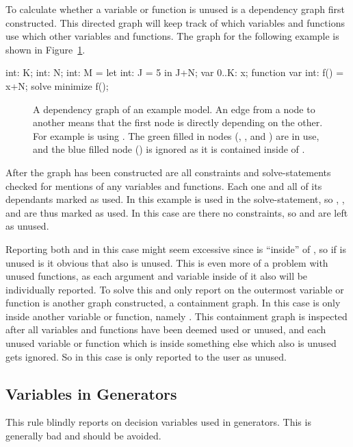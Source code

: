\documentclass[a4paper,12pt]{article}
\begin{document}
To calculate whether a variable or function is unused is a dependency graph first
constructed. This directed graph will keep track of which variables and functions use
which other variables and functions. The graph for the following example is shown in
Figure~\ref{fig:unused:graph}.

\begin{mznnobreak}
int: K; int: N;
int: M = let {int: J = 5} in J+N;
var 0..K: x;
function var int: f() = x+N;
solve minimize f();
\end{mznnobreak}

\begin{figure}[ht]
  \centering
  \smallskip%
  
  \smallskip%
  \caption{A dependency graph of an example model. An edge from a node to another means that
    the first node is directly depending on the other. For example is  using .
    The green filled in nodes (, ,  and ) are in use, and the blue
    filled node () is ignored as it is contained inside of .}%
  \label{fig:unused:graph}
\end{figure}

After the graph has been constructed are all constraints and solve-statements checked for
mentions of any variables and functions. Each one and all of its
dependants marked as used. In this example is  used in the solve-statement, so
, ,  and  are thus marked as used. In this case are there no
constraints, so  and  are left as unused.

Reporting both  and  in this case might seem excessive since  is
``inside'' of , so if  is unused is it obvious that  also is unused.
This is even more of a problem with unused functions, as each argument and variable inside
of it also will be individually reported. To solve this and only report on the outermost
variable or function is another graph constructed, a containment graph. In this case is
only  inside another variable or function, namely . This containment graph is
inspected after all variables and functions have been deemed used or unused, and each
unused variable or function which is inside something else which also is unused gets
ignored. So in this case is only  reported to the user as unused.

\subsection{Variables in Generators}\label{sec:rule:vargen}
This rule blindly reports on decision variables used in generators. This is generally
bad and should be avoided.
\end{document}
